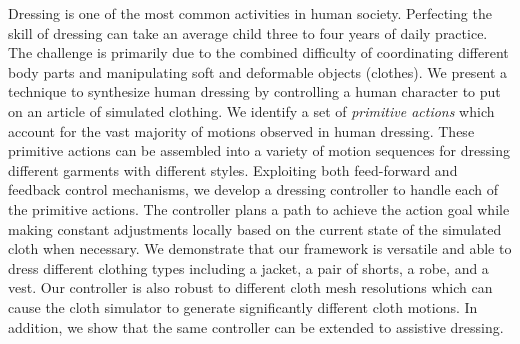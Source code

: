 Dressing is one of the most common activities in human society. Perfecting the skill of dressing can take an average child three to four years of daily practice. The challenge is primarily due to the combined difficulty of coordinating different body parts and manipulating soft and deformable objects (clothes). We present a technique to synthesize human dressing by controlling a human character to put on an article of simulated clothing. We identify a set of \emph{primitive actions} which account for the vast majority of motions observed in human dressing. These primitive actions can be assembled into a variety of motion sequences for dressing different garments with different styles. Exploiting both feed-forward and feedback control mechanisms, we develop a dressing controller to handle each of the primitive actions. The controller plans a path to achieve the action goal while making constant adjustments locally based on the current state of the simulated cloth when necessary. We demonstrate that our framework is versatile and able to dress different clothing types including a jacket, a pair of shorts, a robe, and a vest. Our controller is also robust to different cloth mesh resolutions which can cause the cloth simulator to generate significantly different cloth motions. In addition, we show that the same controller can be extended to assistive dressing.

